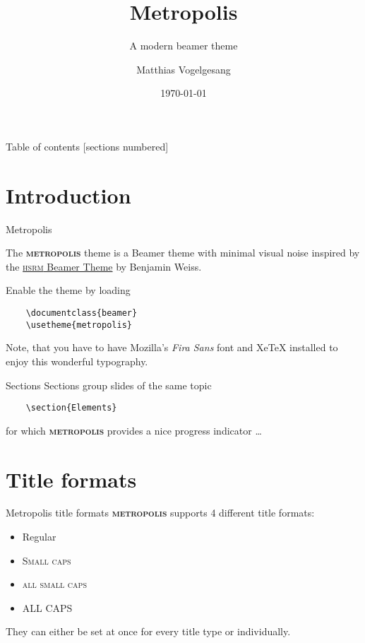 \documentclass[10pt]{beamer}
\title{Metropolis}
\subtitle{A modern beamer theme}
\date{\today}
\author{Matthias Vogelgesang}
\institute{Center for modern beamer themes}
\newcommand{\themename}{\textbf{\textsc{metropolis}}\xspace}
\begin{document}
\maketitle

\begin{frame}{Table of contents}
  [sections numbered]
  \tableofcontents[hideallsubsections]
\end{frame}

\section{Introduction}

\begin{frame}[fragile]{Metropolis}

  The \themename theme is a Beamer theme with minimal visual noise
  inspired by the \href{https://github.com/hsrmbeamertheme/hsrmbeamertheme}{\textsc{hsrm} Beamer
  Theme} by Benjamin Weiss.

  Enable the theme by loading

  \begin{verbatim}    \documentclass{beamer}
    \usetheme{metropolis}\end{verbatim}

    Note, that you have to have Mozilla's \emph{Fira Sans} font and XeTeX
    installed to enjoy this wonderful typography.
\end{frame}
\begin{frame}[fragile]{Sections}
  Sections group slides of the same topic

  \begin{verbatim}    \section{Elements}\end{verbatim}

  for which \themename provides a nice progress indicator \ldots
\end{frame}

\section{Title formats}

\begin{frame}{Metropolis title formats}
  \themename supports 4 different title formats:
  \begin{itemize}
    \item Regular
    \item \textsc{Small caps}
    \item \textsc{all small caps}
    \item ALL CAPS
  \end{itemize}
  They can either be set at once for every title type or individually.
\end{frame}
\end{document}
